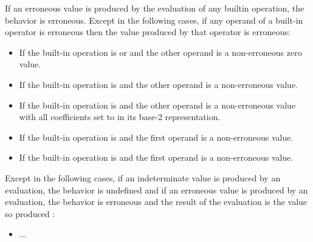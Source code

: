 \begin{adjustwidth}{0.5cm}{0.5cm}
\begin{addedblock}
If an erroneous value is produced by the evaluation of any builtin operation, the behavior is erroneous. Except in the following cases, if any operand of a built-in operator is erroneous then the value
produced by that operator is erroneous:
\begin{itemize}
\item  If the built-in operation is \tcode{*} or \tcode{\&} and the other operand is a non-erroneous zero value.
\item  If the built-in operation is \tcode{\%} and the other operand is a non-erroneous  value.
\item  If the built-in operation is \tcode{|} and the other operand is a non-erroneous value with all coefficients set to  in its base-2 representation.
\item  If the built-in operation is \tcode{\&\&} and the first operand is a non-erroneous  value.
\item  If the built-in operation is \tcode{||} and the first operand is a non-erroneous  value.
\end{itemize}
\end{addedblock}

Except in the following cases, if an indeterminate value is produced by an evaluation,
the behavior is undefined  and if an erroneous value is produced by an evaluation, the behavior is erroneous and
the result of the evaluation is the value so produced 
:
\begin{itemize}
\item ...
\end{itemize}
\end{adjustwidth}




\pagebreak
\renewcommand{\bibname}{References}  %






